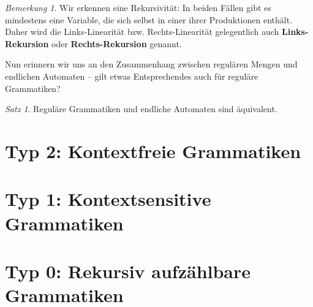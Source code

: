 \documentclass[11pt,a4paper]{scrreport}
\theoremstyle{remark}
\newtheorem{note}{Bemerkung}
\theoremstyle{custom}
\newtheorem{satz}{Satz}[section]
\begin{document}
\begin{note}
Wir erkennen eine Rekursivität: In beiden Fällen gibt es mindestens eine Variable, die sich selbst in einer ihrer Produktionen enthält. Daher wird die Links-Linearität bzw. Rechts-Linearität gelegentlich auch \textbf{Links-Rekursion} oder \textbf{Rechts-Rekursion} genannt.
\end{note}
Nun erinnern wir uns an den Zusammenhang zwischen regulären Mengen und endlichen Automaten -- gilt etwas Entsprechendes auch für reguläre Grammatiken?
\begin{satz}
Reguläre Grammatiken und endliche Automaten sind äquivalent.
\end{satz}
\section{Typ 2: Kontextfreie Grammatiken}
\section{Typ 1: Kontextsensitive Grammatiken}
\section{Typ 0: Rekursiv aufzählbare Grammatiken}
\pagebreak
\normalem
\printbibliography
\end{document}
